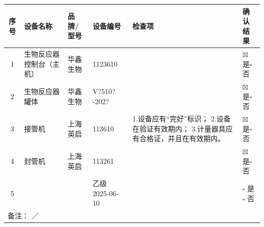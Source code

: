 \documentclass[UTF8,10pt,a4paper,fontset=fandol]{ctexart}
\newcommand{\fieldvalue}[1]{#1}
\newcommand{\handwritten}[1]{#1}
\begin{document}
\small
\begin{tabularx}{\textwidth}{|c|X|X|X|X|X|}
\hline
序号 & 设备名称 & 品牌/型号 & 设备编号 & 检查项 & 确认结果 \\
\hline
1 &
\fieldvalue{生物反应器控制台（主机）} &
\fieldvalue{华鑫生物} &
\fieldvalue{\handwritten{1123610}} &
\multirow{5}{*}{1.设备应有“完好”标识；\newline
2.设备在验证有效期内；\newline
3.计量器具应有合格证，并且在有效期内。} &
\fieldvalue{\ensuremath{\boxtimes}\,是}\quad$\square$ 否 \\
\hline
2 &
\fieldvalue{生物反应器罐体} &
\fieldvalue{华鑫生物} &
\fieldvalue{\handwritten{V?510?-202?}} &
&
\fieldvalue{\ensuremath{\boxtimes}\,是}\quad$\square$ 否 \\
\hline
3 &
\fieldvalue{接管机} &
\fieldvalue{上海英启} &
\fieldvalue{\handwritten{113610}} &
&
\fieldvalue{\ensuremath{\boxtimes}\,是}\quad$\square$ 否 \\
\hline
4 &
\fieldvalue{封管机} &
\fieldvalue{上海英启} &
\fieldvalue{\handwritten{113261}} &
&
\fieldvalue{\ensuremath{\boxtimes}\,是}\quad$\square$ 否 \\
\hline
5 & & &
\fieldvalue{\handwritten{乙级 2025-06-10}} &
& $\square$ 是\quad$\square$ 否 \\
\hline
\multicolumn{6}{|l|}{备注：%
\handwritten{／}} \\
\hline
\end{tabularx}
\normalsize
\end{document}
